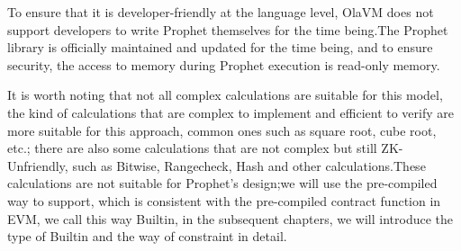 To ensure that it is developer-friendly at the language level, OlaVM does not support developers to write Prophet themselves for
the time being.The Prophet library is officially maintained and updated for the time being, and to ensure security, the access to
memory during Prophet execution is read-only memory.

It is worth noting that not all complex calculations are suitable for this model, the kind of calculations that are complex to implement
and efficient to verify are more suitable for this approach, common ones such as square root, cube root, etc.; there are also some calculations
that are not complex but still ZK-Unfriendly, such as Bitwise, Rangecheck, Hash and other calculations.These calculations are not suitable
for Prophet's design;we will use the pre-compiled way to support, which is consistent with the pre-compiled contract function in EVM, we
call this way Builtin, in the subsequent chapters, we will introduce the type of Builtin and the way of constraint in detail.